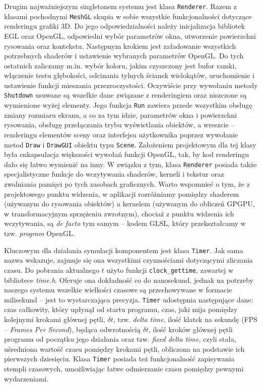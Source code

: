 	Drugim najważniejszym singletonem systemu jest klasa \texttt{Renderer}. Razem z klasami pochodnymi \texttt{MeshGL} skupia w sobie wszystkie funkcjonalności dotyczące renderingu grafiki 3D. Do jego odpowiedzialności należy inicjalizacja bibliotek EGL oraz OpenGL, odpowiedni wybór parametrów okna, utworzenie powierzchni rysowania oraz kontekstu. Następnym krokiem jest załadowanie wszystkich potrzebnych shaderów i ustawienie wybranych parametrów OpenGL. Do tych ostatnich zaliczamy m.in. wybór koloru, jakim czyszczony jest bufor ramki, włączenie testu głębokości, odcinania tylnych ścianek wielokątów, uruchomienie i ustawienie funkcji mieszania przezroczystości. Oczywiście przy wywołaniu metody \texttt{Shutdown} usuwane są wszelkie dane związane z renderingiem oraz niszczone są wymienione wyżej elementy. Jego funkcja \texttt{Run} zawiera przede wszystkim obsługę zmiany rozmiaru ekranu, a co za tym idzie, parametrów okna i powierzchni rysowania, obsługę przełączania trybu wyświetlania obiektów, a wreszcie -- renderingu elementów sceny oraz interfejsu użytkownika poprzez wywołanie metod \texttt{Draw} i \texttt{DrawGUI} obiektu typu \texttt{Scene}. Założeniem projektowym dla tej klasy była enkapsulacja większości wywołań funkcji OpenGL, tak, by kod renderingu dało się łatwo wymienić na inny. W związku z tym, klasa \texttt{Renderer} posiada także specjalistyczne funkcje do wczytywania shaderów, kerneli i tekstur oraz zwalniania pamięci po tych zasobach graficznych. Warto wspomnieć o tym, że z projektowego punktu widzenia, w aplikacji rozróżniamy pomiędzy shaderem (używanym do rysowania obiektów) a kernelem (używanym do obliczeń GPGPU, w transformacyjnym sprzężeniu zwrotnym), chociaż z punktu widzenia ich wczytywania, są \emph{de facto} tym samym -- kodem GLSL, który przekształcamy w tzw. \emph{program} OpenGL. 
	
	Kluczowym dla działania symulacji komponentem jest klasa \texttt{Timer}. Jak sama nazwa wskazuje, zajmuje się ona wszystkimi czynnościami dotyczącymi zliczania czasu. Do pobrania aktualnego \(t\) użyto funkcji \texttt{clock\_gettime}, zawartej w bibliotece \emph{time.h}. Oferuje ona dokładność co do nanosekund, jednak na potrzeby naszego systemu wszelkie wielkości czasowe są przechowywane w formacie milisekund -- jest to wystarczająca precyzja. \texttt{Timer} udostępnia następujące dane: czas całkowity, który upłynął od startu programu, czas, jaki mija pomiędzy kolejnymi krokami głównej pętli, \(\delta t \), tzw. \emph{delta time}, ilość klatek na sekundę (FPS -- \emph{Frames Per Second}), będąca odwrotnością \(\delta t \), ilość kroków głównej pętli programu od początku jego działania oraz tzw. \emph{fixed delta time}, czyli stała, uśredniona wartość czasu pomiędzy krokami pętli, obliczona na podstawie ich pierwszych dziesięciu. Klasa \texttt{Timer} posiada też funkcjonalność zapisywania stempli czasowych, umożliwiając łatwe odmierzanie czasu pomiędzy pewnymi wydarzeniami.
	
